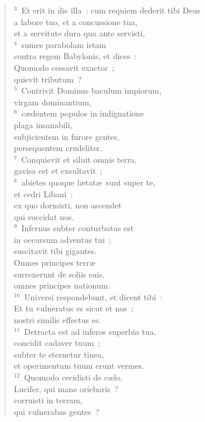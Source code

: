 \begin{flushleft}\begin{verse}${}^{3}$~Et erit in die illa~: cum requiem dederit tibi Deus\\ a labore tuo, et a concussione tua,\\ et a servitute dura qua ante servisti,\\
${}^{4}$~sumes parabolam istam\\ contra regem Babylonis, et dices~:\\ Quomodo cessavit exactor~;\\ quievit tributum~?\\
${}^{5}$~Contrivit Dominus baculum impiorum,\\ virgam dominantium,\\
${}^{6}$~c\ae dentem populos in indignatione\\ plaga insanabili,\\ subjicientem in furore gentes,\\ persequentem crudeliter.\\
${}^{7}$~Conquievit et siluit omnis terra,\\ gavisa est et exsultavit~;\\
${}^{8}$~abietes quoque l\ae tat\ae\ sunt super te,\\ et cedri Libani~:\\ ex quo dormisti, non ascendet\\ qui succidat nos.\\
${}^{9}$~Infernus subter conturbatus est\\ in occursum adventus tui~;\\ suscitavit tibi gigantes.\\ Omnes principes terr\ae \\ surrexerunt de soliis suis,\\ omnes principes nationum.\\
${}^{10}$~Universi respondebunt, et dicent tibi~:\\ Et tu vulneratus es sicut et nos~;\\ nostri similis effectus es.\\
${}^{11}$~Detracta est ad inferos superbia tua,\\ concidit cadaver tuum~;\\ subter te sternetur tinea,\\ et operimentum tuum erunt vermes.\\
${}^{12}$~Quomodo cecidisti de c\ae lo,\\ Lucifer, qui mane oriebaris~?\\ corruisti in terram,\\ qui vulnerabas gentes~?\\

\end{verse}
\end{flushleft}

